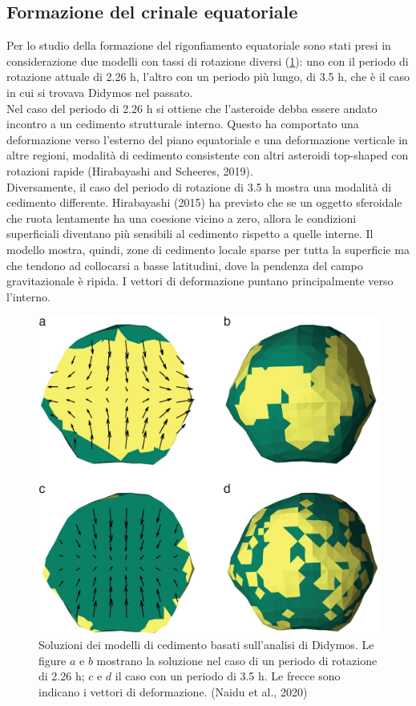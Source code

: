 \documentclass[a4paper,11pt,openright]{book}
\begin{document}
\subsection{Formazione del crinale equatoriale}
Per lo studio della formazione del rigonfiamento equatoriale sono stati presi in considerazione due modelli con tassi di rotazione diversi (\cref{fig:failure_models}): uno con il periodo di rotazione attuale di 2.26 h, l'altro con un periodo più lungo, di 3.5 h, che è il caso in cui si trovava Didymos nel passato.\\
Nel caso del periodo di 2.26 h si ottiene che l'asteroide debba essere andato incontro a un cedimento strutturale interno. Questo ha comportato una deformazione verso l'esterno del piano equatoriale e una deformazione verticale in altre regioni, modalità di cedimento consistente con altri asteroidi top-shaped con rotazioni rapide (Hirabayashi and Scheeres, 2019).\\
Diversamente, il caso del periodo di rotazione di 3.5 h mostra una modalità di cedimento differente. Hirabayashi (2015) ha previsto che se un oggetto sferoidale che ruota lentamente ha una coesione vicino a zero, allora le condizioni superficiali diventano più sensibili al cedimento rispetto a quelle interne. Il modello mostra, quindi, zone di cedimento locale sparse per tutta la superficie ma che tendono ad collocarsi a basse latitudini, dove la pendenza del campo gravitazionale è ripida. I vettori di deformazione puntano principalmente verso l'interno.

\begin{figure}
    \centering
    \includegraphics[scale=0.6]{figure/failure_models.jpg}
    \caption[Soluzioni dei modelli di cedimento basati sull'analisi di Didymos.]{Soluzioni dei modelli di cedimento basati sull'analisi di Didymos. Le figure $a$ e $b$ mostrano la soluzione nel caso di un periodo di rotazione di 2.26 h; $c$ e $d$ il caso con un periodo di 3.5 h. Le frecce sono indicano i vettori di deformazione. (Naidu et al., 2020)}
    \label{fig:failure_models}
\end{figure}
\end{document}
